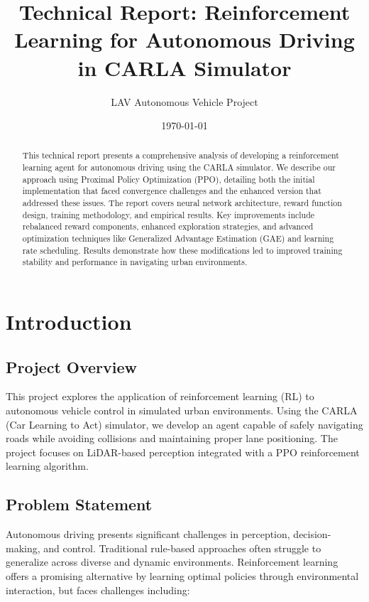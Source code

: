 \documentclass[11pt,a4paper]{article}
\title{Technical Report: Reinforcement Learning for Autonomous Driving in CARLA Simulator}
\author{LAV Autonomous Vehicle Project}
\date{\today}
\begin{document}
\maketitle

\begin{abstract}
This technical report presents a comprehensive analysis of developing a reinforcement learning agent for autonomous driving using the CARLA simulator. We describe our approach using Proximal Policy Optimization (PPO), detailing both the initial implementation that faced convergence challenges and the enhanced version that addressed these issues. The report covers neural network architecture, reward function design, training methodology, and empirical results. Key improvements include rebalanced reward components, enhanced exploration strategies, and advanced optimization techniques like Generalized Advantage Estimation (GAE) and learning rate scheduling. Results demonstrate how these modifications led to improved training stability and performance in navigating urban environments.
\end{abstract}

\tableofcontents

\section{Introduction}
\subsection{Project Overview}
This project explores the application of reinforcement learning (RL) to autonomous vehicle control in simulated urban environments. Using the CARLA (Car Learning to Act) simulator, we develop an agent capable of safely navigating roads while avoiding collisions and maintaining proper lane positioning. The project focuses on LiDAR-based perception integrated with a PPO reinforcement learning algorithm.

\subsection{Problem Statement}
Autonomous driving presents significant challenges in perception, decision-making, and control. Traditional rule-based approaches often struggle to generalize across diverse and dynamic environments. Reinforcement learning offers a promising alternative by learning optimal policies through environmental interaction, but faces challenges including:
\end{document}
